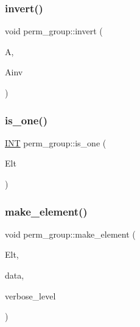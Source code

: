 \mbox{\label{classperm__group_a265d46b10e634cdb35f478a6f353bd1b}} 
\subsubsection{\texorpdfstring{invert()}{invert()}}
{\footnotesize\ttfamily void perm\+\_\+group\+::invert (\begin{DoxyParamCaption}\item[{\mbox{\hyperlink{galois_8h_a09fddde158a3a20bd2dcadb609de11dc}{I\+NT}} $\ast$}]{A,  }\item[{\mbox{\hyperlink{galois_8h_a09fddde158a3a20bd2dcadb609de11dc}{I\+NT}} $\ast$}]{Ainv }\end{DoxyParamCaption})}

\mbox{\label{classperm__group_ac219afd31a76964f8c49d5132e0f4348}} 
\subsubsection{\texorpdfstring{is\+\_\+one()}{is\_one()}}
{\footnotesize\ttfamily \mbox{\hyperlink{galois_8h_a09fddde158a3a20bd2dcadb609de11dc}{I\+NT}} perm\+\_\+group\+::is\+\_\+one (\begin{DoxyParamCaption}\item[{\mbox{\hyperlink{galois_8h_a09fddde158a3a20bd2dcadb609de11dc}{I\+NT}} $\ast$}]{Elt }\end{DoxyParamCaption})}

\mbox{\label{classperm__group_a52c1c9e55966809c1e30aad80df87774}} 
\subsubsection{\texorpdfstring{make\+\_\+element()}{make\_element()}}
{\footnotesize\ttfamily void perm\+\_\+group\+::make\+\_\+element (\begin{DoxyParamCaption}\item[{\mbox{\hyperlink{galois_8h_a09fddde158a3a20bd2dcadb609de11dc}{I\+NT}} $\ast$}]{Elt,  }\item[{\mbox{\hyperlink{galois_8h_a09fddde158a3a20bd2dcadb609de11dc}{I\+NT}} $\ast$}]{data,  }\item[{\mbox{\hyperlink{galois_8h_a09fddde158a3a20bd2dcadb609de11dc}{I\+NT}}}]{verbose\+\_\+level }\end{DoxyParamCaption})}

